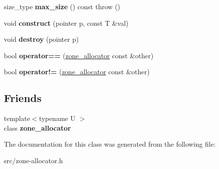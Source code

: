 \begin{DoxyCompactItemize}
\item 
\hypertarget{classv8_1_1internal_1_1zone__allocator_acc053240888a4ee0858b30411dde72d4}{}size\+\_\+type {\bfseries max\+\_\+size} () const   throw ()\label{classv8_1_1internal_1_1zone__allocator_acc053240888a4ee0858b30411dde72d4}

\item 
\hypertarget{classv8_1_1internal_1_1zone__allocator_a6577687565596d029f37507793c45967}{}void {\bfseries construct} (pointer p, const T \&val)\label{classv8_1_1internal_1_1zone__allocator_a6577687565596d029f37507793c45967}

\item 
\hypertarget{classv8_1_1internal_1_1zone__allocator_a59a75d1b6c2220221bb73863bf66f56b}{}void {\bfseries destroy} (pointer p)\label{classv8_1_1internal_1_1zone__allocator_a59a75d1b6c2220221bb73863bf66f56b}

\item 
\hypertarget{classv8_1_1internal_1_1zone__allocator_ab6060abfd31de6f7e54f4cc25eb45b94}{}bool {\bfseries operator==} (\hyperlink{classv8_1_1internal_1_1zone__allocator}{zone\+\_\+allocator} const \&other)\label{classv8_1_1internal_1_1zone__allocator_ab6060abfd31de6f7e54f4cc25eb45b94}

\item 
\hypertarget{classv8_1_1internal_1_1zone__allocator_aa88ebbcb8cd7855e95c5b4ea4144ff60}{}bool {\bfseries operator!=} (\hyperlink{classv8_1_1internal_1_1zone__allocator}{zone\+\_\+allocator} const \&other)\label{classv8_1_1internal_1_1zone__allocator_aa88ebbcb8cd7855e95c5b4ea4144ff60}

\end{DoxyCompactItemize}
\subsection*{Friends}
\begin{DoxyCompactItemize}
\item 
\hypertarget{classv8_1_1internal_1_1zone__allocator_afcabc8cbdfd097d75094d17cd848aada}{}{\footnotesize template$<$typename U $>$ }\\class {\bfseries zone\+\_\+allocator}\label{classv8_1_1internal_1_1zone__allocator_afcabc8cbdfd097d75094d17cd848aada}

\end{DoxyCompactItemize}


The documentation for this class was generated from the following file\+:\begin{DoxyCompactItemize}
\item 
src/zone-\/allocator.\+h\end{DoxyCompactItemize}
